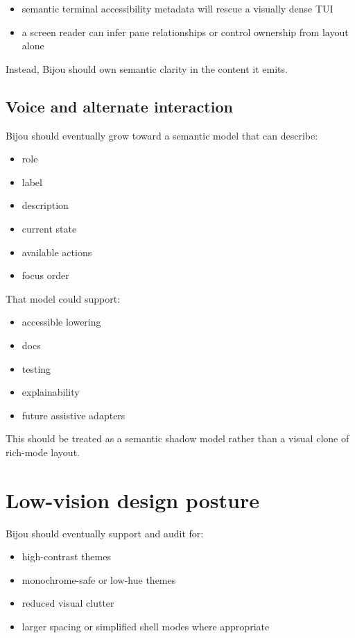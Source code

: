 \begin{itemize}
\tightlist
\item
  semantic terminal accessibility metadata will rescue a visually dense TUI
\item
  a screen reader can infer pane relationships or control ownership from layout alone
\end{itemize}

Instead, Bijou should own semantic clarity in the content it emits.

\subsection{Voice and alternate interaction}\label{record-032-voice-and-alternate-interaction}

Bijou should eventually grow toward a semantic model that can describe:

\begin{itemize}
\tightlist
\item
  role
\item
  label
\item
  description
\item
  current state
\item
  available actions
\item
  focus order
\end{itemize}

That model could support:

\begin{itemize}
\tightlist
\item
  accessible lowering
\item
  docs
\item
  testing
\item
  explainability
\item
  future assistive adapters
\end{itemize}

This should be treated as a semantic shadow model rather than a visual clone of rich-mode layout.

\section{Low-vision design posture}\label{record-032-low-vision-design-posture}

Bijou should eventually support and audit for:

\begin{itemize}
\tightlist
\item
  high-contrast themes
\item
  monochrome-safe or low-hue themes
\item
  reduced visual clutter
\item
  larger spacing or simplified shell modes where appropriate
\end{itemize}

